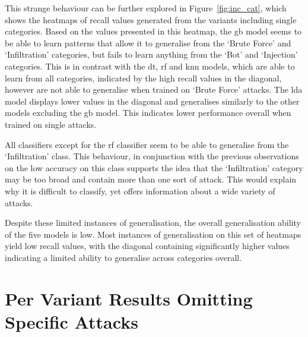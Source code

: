 This strange behaviour can be further explored in Figure~\ref{fig:inc_cat},
which shows the heatmaps of recall values generated from the variants including
single categories. Based on the values presented in this heatmap, the \gls{gb}
model seems to be able to learn patterns that allow it to generalise from the
`Brute Force' and `Infiltration' categories, but fails to learn anything from
the `Bot' and `Injection' categories. This is in contrast with the \gls{dt},
\gls{rf} and \gls{knn} models, which are able to learn from all categories,
indicated by the high recall values in the diagonal, however are not able to
generalise when trained on `Brute Force' attacks. The \gls{lda} model displays
lower values in the diagonal and generalises similarly to the other models
excluding the \gls{gb} model. This indicates lower performance overall when
trained on single attacks.

All classifiers except for the \gls{rf} classifier seem to be able to
generalise from the `Infiltration' class. This behaviour, in conjunction with
the previous observations on the low accuracy on this class supports the idea
that the `Infiltration' category may be too broad and contain more than one
sort of attack. This would explain why it is difficult to classify, yet offers
information about a wide variety of attacks.

Despite these limited instances of generalisation, the overall generalisation
ability of the five models is low. Most instances of generalisation on this set
of heatmaps yield low recall values, with the diagonal containing significantly
higher values indicating a limited ability to generalise across categories
overall.

\section{Per Variant Results Omitting Specific Attacks}%
\label{sec:res_var_att}

